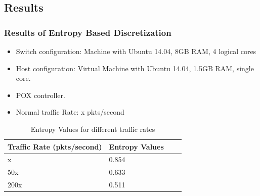 \documentclass[10pt]{beamer}
\begin{document}
\begin{frame}
\section[]{Results}
\frametitle{Results of Entropy Based Discretization}
\begin{itemize}
\footnotesize
\item
Switch configuration: Machine with Ubuntu 14.04, 8GB RAM, 4 logical cores
\item
Host configuration: Virtual Machine with Ubuntu 14.04, 1.5GB RAM, single core. 
\item 
POX controller.

\item
Normal traffic Rate: x pkts/second
\end{itemize}

\begin{table}
\scriptsize
\begin{center}
\begin{tabular}{ | m{2cm} | m{2cm}| m{2cm} | m{2cm} |} 
\hline
\textbf{Traffic Rate (pkts/second)} & \textbf{Entropy Values} \\
\hline
x &
0.854 \\
\hline
50x &
0.633 \\
\hline
200x &
0.511 \\
\hline
\end{tabular}
\end{center}
\caption{\footnotesize Entropy Values for different traffic rates}
\end{table}
\end{frame}
\end{document}
